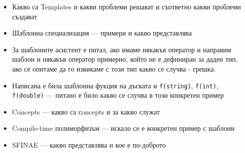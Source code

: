 \documentclass[a4paper,11pt]{article}
\newcommand{\qtag}[1]{\texttt{\color{greenaccent}\small#1}}
\begin{document}
\begin{tcolorbox}[categorybox, title={5.\ Шаблони (Templates)}]
\begin{itemize}
\item Какво са Templates и какви проблеми решават и съответно какви проблеми създават
  \item Шаблонна специализация — примери и какво представлява
  \item За шаблоните асистент е питал, ако имаме някакъв оператор и направим шаблон и някакъв оператор примерно, който не е дефиниран за даден тип, ако се опитаме да го извикаме с този тип какво се случва - грешка.
  \item Написана е била шаблонна фукция на дъската и \qtag{f(string)}, \qtag{f(int)}, \qtag{f(double)} — питано е било какво се случва в този конкретен пример
  \item Concepts — какво са сoncepts и за какво служат
  \item Compile-time полиморфизъм — искало се е конкретен пример с шаблони
  \item SFINAE — какво представлява и кое е по-доброто
\end{itemize}
\end{tcolorbox}
\end{document}
